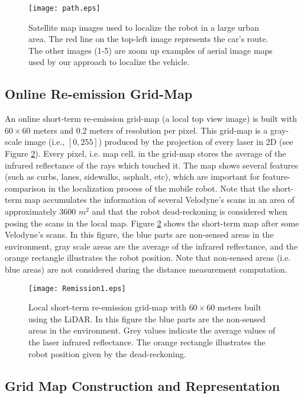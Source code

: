 \begin{figure}[ht]
    \centering
    \texttt{[image: path.eps]}
    \caption{Satellite map images used to localize the robot in a large urban area. The red line on the top-left image represents the car's route. The other images (1-5) are zoom up examples of aerial image maps used by our approach to localize the vehicle.}
    \label{Fig::Path}
\end{figure}

\subsection{Online Re-emission Grid-Map}

An online short-term re-emission grid-map (a local top view image) is built with $60\times60$ meters and 0.2 meters of resolution per pixel. This grid-map is a gray-scale image (i.e., $[0, 255]$) produced by the projection of every laser in 2D (see Figure \ref{Fig::Remission1}). Every pixel, i.e. map cell, in the grid-map stores the average of the infrared reflectance of the rays which touched it. The map shows several features (such as curbs, lanes, sidewalks, asphalt, etc), which are important for feature-comparison in the localization process of the mobile robot. Note that the short-term map accumulates the information of several Velodyne's scans in an area of approximately 3600 $m^2$ and that the robot dead-reckoning is considered when posing the scans in the local map. Figure \ref{Fig::Remission1} shows the short-term map after some Velodyne's scans. In this figure, the blue parts are non-sensed areas in the environment, gray scale areas are the average of the infrared reflectance, and the orange rectangle illustrates the robot position. Note that non-sensed areas (i.e. blue areas) are not considered during the distance measurement computation.



\begin{figure}[ht]
    \centering
    \texttt{[image: Remission1.eps]}
    \caption{Local short-term re-emission grid-map with $60\times60$ meters built using the LiDAR. In this figure the blue parts are the non-sensed areas in the environment. Grey values indicate the average values of the laser infrared reflectance. The orange rectangle illustrates the robot position given by the dead-reckoning.}
    \label{Fig::Remission1}
\end{figure}

\subsection{Grid Map Construction and Representation}
\label{sec::ch2-mapping}


